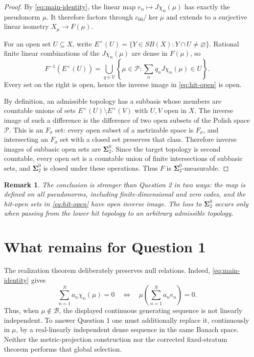 \documentclass[11pt]{article}
\newtheorem{remark}[theorem]{Remark}
\theoremstyle{definition}
\newcommand{\Pcal}{\mathcal P}
\newcommand{\Bcal}{\mathcal B}
\newcommand{\SigmaTwo}{\boldsymbol{\Sigma}^{0}_{2}}
\begin{document}
\begin{proof}
By \eqref{eq:main-identity}, the linear map
$e_n\mapsto J\chi_n(\mu)$ has exactly the pseudonorm $\mu$.  It therefore
factors through $c_{00}/\ker\mu$ and extends to a surjective linear isometry
$X_\mu\to F(\mu)$.

For an open set $U\subseteq X$, write
$E^+(U)=\{Y\in SB(X):Y\cap U\neq\varnothing\}$.  Rational finite linear
combinations of the $J\chi_n(\mu)$ are dense in $F(\mu)$, so
\[
 F^{-1}(E^+(U))
 =\bigcup_{q\in V}
   \left\{\mu\in\Pcal:
      \sum_n q_nJ\chi_n(\mu)\in U\right\}.
 \tag{6.2}\label{eq:hit-open}
\]
Every set on the right is open, hence the inverse image in
\eqref{eq:hit-open} is open.

By definition, an admissible topology has a subbasis whose members are
countable unions of sets $E^+(U)\setminus E^+(V)$ with $U,V$ open in $X$.
The inverse image of such a difference is the difference of two open subsets of
the Polish space $\Pcal$.  This is an $F_\sigma$ set: every open subset of a
metrizable space is $F_\sigma$, and intersecting an $F_\sigma$ set with a closed
set preserves that class.  Therefore inverse images of
subbasic open sets are $\boldsymbol\Sigma^0_2$.  Since the target topology is
second countable, every open set is a countable union of finite intersections
of subbasic sets, and $\boldsymbol\Sigma^0_2$ is closed under these operations.
Thus $F$ is $\SigmaTwo$-measurable.
\end{proof}

\begin{remark}
The conclusion is stronger than Question 2 in two ways: the map is defined on
all pseudonorms, including finite-dimensional and zero codes, and the hit-open
sets in \eqref{eq:hit-open} have open inverse image.  The loss to
$\boldsymbol\Sigma^0_2$ occurs only when passing from the lower hit topology to
an arbitrary admissible topology.
\end{remark}

\section{What remains for Question 1}

The realization theorem deliberately preserves null relations.  Indeed,
\eqref{eq:main-identity} gives
\[
 \sum_{n=1}^N a_n\chi_n(\mu)=0
 \quad\Longleftrightarrow\quad
 \mu\left(\sum_{n=1}^N a_ne_n\right)=0.
 \tag{7.1}\label{eq:null-relations}
\]
Thus, when $\mu\notin\Bcal$, the displayed continuous generating sequence is
not linearly independent.  To answer Question 1 one must additionally replace
it, continuously in $\mu$, by a real-linearly independent dense sequence in the
same Banach space.  Neither the metric-projection construction nor the corrected
fixed-stratum theorem performs that global selection.
\end{document}
